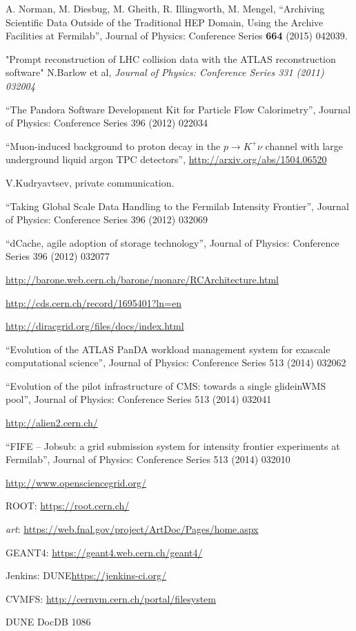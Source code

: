 \documentclass[12pt]{article}
\begin{document}
\begin{thebibliography}{99}
 A. Norman, M. Diesbug, M. Gheith, R. Illingworth, M. Mengel, ``Archiving Scientific Data Outside of the Traditional HEP Domain, Using the Archive Facilities at Fermilab'', Journal of Physics: Conference Series {\bf 664} (2015) 042039.

 "Prompt reconstruction of LHC collision data with the ATLAS reconstruction software" N.Barlow et al, \textit{Journal of Physics: Conference Series 331 (2011) 032004}

 ``The Pandora Software Development Kit for Particle Flow Calorimetry'', Journal of Physics: Conference Series 396 (2012) 022034

 ``Muon-induced background to proton decay in the $p \rightarrow K^+\nu$ channel with large underground liquid argon TPC detectors'', \url{http://arxiv.org/abs/1504.06520}

 V.Kudryavtsev, private communication.

 ``Taking Global Scale Data Handling to the Fermilab Intensity Frontier'', Journal of Physics: Conference Series 396 (2012) 032069

 ``dCache, agile adoption of storage technology'', Journal of Physics: Conference Series 396 (2012) 032077

 \url{http://barone.web.cern.ch/barone/monarc/RCArchitecture.html}

 \url{http://cds.cern.ch/record/1695401?ln=en}

 \url{http://diracgrid.org/files/docs/index.html}

 ``Evolution of the ATLAS PanDA workload management system for exascale computational science'', Journal of Physics: Conference Series 513 (2014) 032062

 ``Evolution of the pilot infrastructure of CMS: towards a single glideinWMS pool'',  Journal of Physics: Conference Series 513 (2014) 032041

 \url{http://alien2.cern.ch/}

 ``FIFE -- Jobsub: a grid submission system for intensity frontier experiments at Fermilab'',  Journal of Physics: Conference Series 513 (2014) 032010

 \url{http://www.opensciencegrid.org/}

 ROOT: \url{https://root.cern.ch/}

 \textit{art}: \url{https://web.fnal.gov/project/ArtDoc/Pages/home.aspx}

 GEANT4: \url{https://geant4.web.cern.ch/geant4/}

 Jenkins: DUNE\url{https://jenkins-ci.org/}

 CVMFS: \url{http://cernvm.cern.ch/portal/filesystem}

 DUNE DocDB 1086 %

\end{thebibliography}
\end{document}
